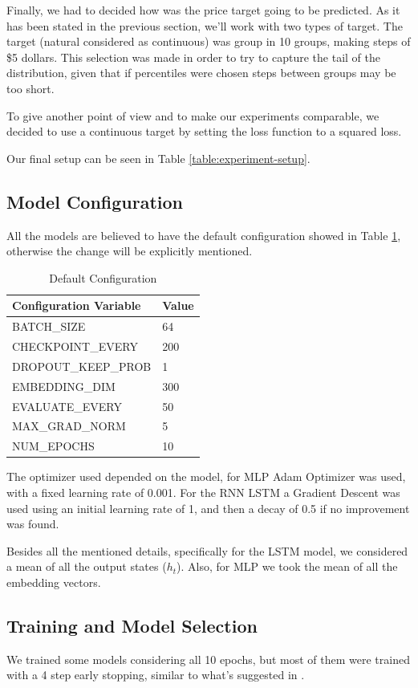 \documentclass[11pt,letterpaper]{article}
\begin{document}
Finally, we had to decided how was the price target going to be predicted. As it has been stated in the previous section, we'll work with two types of target. The target (natural considered as continuous) was group in 10 groups, making steps of \$5 dollars. This selection was made in order to try to capture the tail of the distribution, given that if percentiles were chosen steps between groups may be too short. 

To give another point of view and to make our experiments comparable, we decided to use a continuous target by setting the loss function to a squared loss.

Our final setup can be seen in Table \ref{table:experiment-setup}. 

\subsection{Model Configuration}

All the models are believed to have the default configuration showed in Table \ref{table:def-config}, otherwise the change will be explicitly mentioned.
\begin{table}[ht!]
\centering
\caption{Default Configuration}
\label{table:def-config}
\scalebox{0.8} 
{\begin{tabular}{|l|l|}
\hline
\textbf{Configuration Variable} & \textbf{Value} \\ \hline \hline
BATCH\_SIZE & 64 \\ 
CHECKPOINT\_EVERY & 200 \\ 
DROPOUT\_KEEP\_PROB & 1 \\ 
EMBEDDING\_DIM & 300 \\ 
EVALUATE\_EVERY & 50 \\ 
MAX\_GRAD\_NORM & 5 \\ 
NUM\_EPOCHS & 10 \\ \hline \hline
\end{tabular}}
\end{table}

The optimizer used depended on the model, for MLP Adam Optimizer was used, with a fixed learning rate of 0.001. For the RNN LSTM a Gradient Descent was used using an initial learning rate of 1, and then a decay of 0.5 if no improvement was found. 

Besides all the mentioned details, specifically for the LSTM model, we considered a mean of all the output states ($h_t$). Also, for MLP we took the mean of all the embedding vectors.

\subsection{Training and Model Selection}
We trained some models considering all 10 epochs, but most of them were trained with a 4 step early stopping, similar to what's suggested in \cite{cho2015natural}. 
\end{document}
